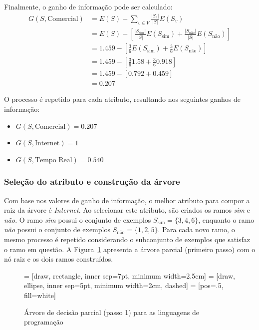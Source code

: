 Finalmente, o ganho de informação pode ser calculado:
\begin{align*}
	G(S, \text{Comercial}) &= E(S) - \sum_{v \in V} \frac{|S_v|}{|S|} E(S_v)\\[10pt]
	&= E(S) - \left[ \frac{|S_\text{sim}|}{|S|} E(S_\text{sim}) + \frac{|S_\text{não}|}{|S|} E(S_\text{não}) \right]\\[10pt]
	&= 1.459 - \left[ \frac{3}{6} E(S_\text{sim}) + \frac{3}{6} E(S_\text{não}) \right]\\[10pt]
	&= 1.459 - \left[ \frac{3}{6} 1.58 + \frac{3}{6} 0.918 \right]\\[10pt]
	&= 1.459 - \left[ 0.792 + 0.459 \right]\\[10pt]
	&= 0.207
\end{align*}

O processo é repetido para cada atributo, resultando nos seguintes ganhos de informação:
\begin{itemize}
	\item $G(S, \text{Comercial}) = 0.207$
	\item $G(S, \text{Internet}) = 1$
	\item $G(S, \text{Tempo Real}) = 0.540$
\end{itemize}

\insertspace

\subsubsection{Seleção do atributo e construção da árvore}

Com base nos valores de ganho de informação, o melhor atributo para compor a raiz da árvore é \textit{Internet}. Ao selecionar este atributo, são criados os ramos \textit{sim} e \textit{não}. O ramo \textit{sim} possui o conjunto de exemplos $S_\text{sim} = \{3, 4, 6\}$, enquanto o ramo \textit{não} possui o conjunto de exemplos $S_\text{não} = \{1, 2, 5\}$. Para cada novo ramo, o mesmo processo é repetido considerando o subconjunto de exemplos que satisfaz o ramo em questão. A Figura~\ref{fig:arvore-parcial-linguagens-programacao-1} apresenta a árvore parcial (primeiro passo) com o nó raiz e os dois ramos construídos.

\begin{figure}[h]
	\centering
	 = [draw, rectangle, inner sep=7pt, minimum width=2.5cm]
	 = [draw, ellipse, inner sep=5pt, minimum width=2cm, dashed]
	 = [pos=.5, fill=white]
	
	
	\caption{Árvore de decisão parcial (passo 1) para as linguagens de programação}
	\label{fig:arvore-parcial-linguagens-programacao-1}
\end{figure}

